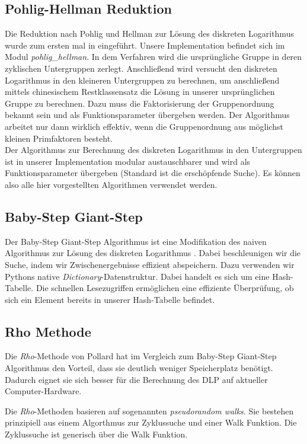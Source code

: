 \documentclass{scrartcl}
\begin{document}
\subsection{Pohlig-Hellman Reduktion}
\label{sec:pohlig_hellman}
Die Reduktion nach Pohlig und Hellman zur Lösung des diskreten Logarithmus wurde zum ersten mal in \cite{Pohlig1978} eingeführt. Unsere Implementation befindet sich im Modul \emph{pohlig\_hellman}. In dem Verfahren wird die ursprüngliche Gruppe in deren zyklischen Untergruppen zerlegt. Anschließend wird versucht den diskreten Logarithmus in den kleineren Untergruppen zu berechnen, um anschließend mittels chinesischem Restklassensatz die Lösung in unserer ursprünglichen Gruppe zu berechnen. Dazu muss die Faktorisierung der Gruppenordnung bekannt sein und als Funktionsparameter übergeben werden. Der Algorithmus arbeitet nur dann wirklich effektiv, wenn die Gruppenordnung aus möglichst kleinen Primfaktoren besteht.\\
Der Algorithmus zur Berechnung des diskreten Logarithmus in den Untergruppen ist in unserer Implementation modular austauschbarer und wird als Funktionsparameter übergeben (Standard ist die erschöpfende Suche). Es können also alle hier vorgestellten Algorithmen verwendet werden.
\subsection{Baby-Step Giant-Step}
\label{sec:baby_step_giant_step}
Der Baby-Step Giant-Step Algorithmus ist eine Modifikation des naiven Algorithmus zur Lösung des diskreten Logarithmus  \cite{Galbraith2012}. Dabei beschleunigen wir die Suche, indem wir Zwischenergebnisse effizient abspeichern. Dazu verwenden wir Pythons native \emph{Dictionary}-Datenstruktur. Dabei handelt es sich um eine Hash-Tabelle. Die schnellen Lesezugriffen ermöglichen eine effiziente Überprüfung, ob sich ein Element bereits in unserer Hash-Tabelle befindet.
\subsection{Rho Methode}
\label{sec:rho}
Die \emph{Rho}-Methode von Pollard hat im Vergleich zum Baby-Step Giant-Step Algorithmus den Vorteil,
dass sie deutlich weniger Speicherplatz benötigt.
Dadurch eignet sie sich besser für die Berechnung des DLP auf aktueller Computer-Hardware.

Die \emph{Rho}-Methoden basieren auf sogenannten \emph{pseudorandom walks}.
Sie bestehen prinzipiell aus einem Algorthmus zur Zyklussuche
und einer Walk Funktion.
Die Zyklussuche ist generisch über die Walk Funktion.
\end{document}
